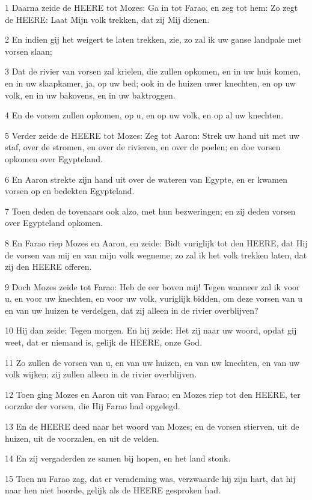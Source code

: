\par 1 Daarna zeide de HEERE tot Mozes: Ga in tot Farao, en zeg tot hem: Zo zegt de HEERE: Laat Mijn volk trekken, dat zij Mij dienen.
\par 2 En indien gij het weigert te laten trekken, zie, zo zal ik uw ganse landpale met vorsen slaan;
\par 3 Dat de rivier van vorsen zal krielen, die zullen opkomen, en in uw huis komen, en in uw slaapkamer, ja, op uw bed; ook in de huizen uwer knechten, en op uw volk, en in uw bakovens, en in uw baktroggen.
\par 4 En de vorsen zullen opkomen, op u, en op uw volk, en op al uw knechten.
\par 5 Verder zeide de HEERE tot Mozes: Zeg tot Aaron: Strek uw hand uit met uw staf, over de stromen, en over de rivieren, en over de poelen; en doe vorsen opkomen over Egypteland.
\par 6 En Aaron strekte zijn hand uit over de wateren van Egypte, en er kwamen vorsen op en bedekten Egypteland.
\par 7 Toen deden de tovenaars ook alzo, met hun bezweringen; en zij deden vorsen over Egypteland opkomen.
\par 8 En Farao riep Mozes en Aaron, en zeide: Bidt vuriglijk tot den HEERE, dat Hij de vorsen van mij en van mijn volk wegneme; zo zal ik het volk trekken laten, dat zij den HEERE offeren.
\par 9 Doch Mozes zeide tot Farao: Heb de eer boven mij! Tegen wanneer zal ik voor u, en voor uw knechten, en voor uw volk, vuriglijk bidden, om deze vorsen van u en van uw huizen te verdelgen, dat zij alleen in de rivier overblijven?
\par 10 Hij dan zeide: Tegen morgen. En hij zeide: Het zij naar uw woord, opdat gij weet, dat er niemand is, gelijk de HEERE, onze God.
\par 11 Zo zullen de vorsen van u, en van uw huizen, en van uw knechten, en van uw volk wijken; zij zullen alleen in de rivier overblijven.
\par 12 Toen ging Mozes en Aaron uit van Farao; en Mozes riep tot den HEERE, ter oorzake der vorsen, die Hij Farao had opgelegd.
\par 13 En de HEERE deed naar het woord van Mozes; en de vorsen stierven, uit de huizen, uit de voorzalen, en uit de velden.
\par 14 En zij vergaderden ze samen bij hopen, en het land stonk.
\par 15 Toen nu Farao zag, dat er verademing was, verzwaarde hij zijn hart, dat hij naar hen niet hoorde, gelijk als de HEERE gesproken had.
